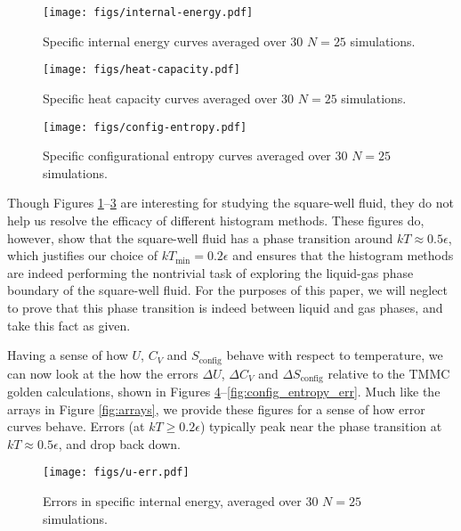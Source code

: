 \documentclass[11pt]{article}
\renewcommand{\t}{\text} %
\begin{document}
\begin{figure}[!b]
  \centering
  \texttt{[image: figs/internal-energy.pdf]}
  \caption[Internal energy]
  {Specific internal energy curves averaged over 30 $N=25$
    simulations.}
  \label{fig:internal_energy}
\end{figure}

\begin{figure}[p]
  \centering
  \texttt{[image: figs/heat-capacity.pdf]}
  \caption[Heat capacity]
  {Specific heat capacity curves averaged over 30 $N=25$ simulations.}
  \label{fig:heat_capacity}
\end{figure}

\begin{figure}[p]
  \centering
  \texttt{[image: figs/config-entropy.pdf]}
  \caption[Configurational entropy]
  {Specific configurational entropy curves averaged over 30 $N=25$
    simulations.}
  \label{fig:config_entropy}
\end{figure}

Though Figures \ref{fig:internal_energy}--\ref{fig:config_entropy} are
interesting for studying the square-well fluid, they do not help us
resolve the efficacy of different histogram methods. These figures do,
however, show that the square-well fluid has a phase transition around
$kT\approx0.5\epsilon$, which justifies our choice of
$kT_{\t{min}}=0.2\epsilon$ and ensures that the histogram methods are
indeed performing the nontrivial task of exploring the liquid-gas
phase boundary of the square-well fluid. For the purposes of this
paper, we will neglect to prove that this phase transition is indeed
between liquid and gas phases, and take this fact as given.

Having a sense of how $U$, $C_V$ and $S_{\t{config}}$ behave with
respect to temperature, we can now look at the how the errors $\Delta
U$, $\Delta C_V$ and $\Delta S_{\t{config}}$ relative to the TMMC
golden calculations, shown in Figures
\ref{fig:internal_energy_err}--\ref{fig:config_entropy_err}. Much like
the arrays in Figure \ref{fig:arrays}, we provide these figures for a
sense of how error curves behave. Errors (at $kT\ge0.2\epsilon$)
typically peak near the phase transition at $kT\approx0.5\epsilon$,
and drop back down.

\begin{figure}[!b]
  \centering
  \texttt{[image: figs/u-err.pdf]}
  \caption[Internal energy error scaling]
  {Errors in specific internal energy, averaged over 30 $N=25$
    simulations.}
  \label{fig:internal_energy_err}
\end{figure}
\end{document}
